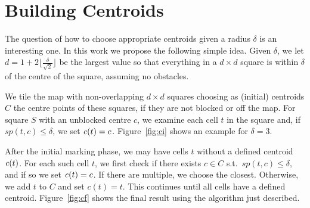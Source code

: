\section{Building Centroids}
\label{sec:centroid}

The question of how to choose appropriate centroids given a radius $\delta$ is an interesting one.
In this work we propose the following simple idea.
Given $\delta$, we let $d = 1 + 2 \lfloor\frac{\delta}{\sqrt{2}} \rfloor$ be the largest value so that everything in a $d \times d$ square is within $\delta$ of the centre of the square, assuming no obstacles. 

We tile the map with non-overlapping $d \times d$ squares choosing as
(initial) centroids $C$ the centre points of these squares, if they are not
blocked or off the map.  For square $S$ with an unblocked centre $c$, we examine each cell
$t$ in the square and, if $sp(t,c) \leq \delta$, we set $\mathit{c}(t) = c$.
Figure~\ref{fig:ci} shows an example for $\delta = 3$.


    
After the initial marking phase, we may have cells $t$ without a defined
centroid $\mathit{c}(t)$.  For each such cell $t$, we first check if there
exists $c \in C$ s.t.\ $sp(t,c) \leq \delta$, and if so we set $\mathit{c}(t)
= c$.  If there are multiple, we choose the closest.
Otherwise, we add $t$ to $C$ and set $c(t) = t$.  This continues until
all cells have a defined centroid.  Figure~\ref{fig:cf} shows the final 
result using the algorithm just described.



